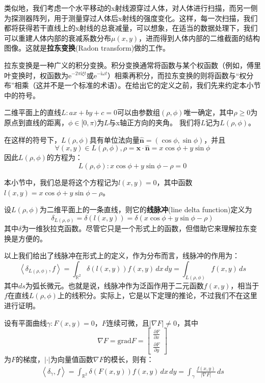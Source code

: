 类似地，我们考虑一个水平移动的x射线源穿过人体，对人体进行扫描，而另一侧为探测器阵列，用于测量穿过人体后x射线的强度变化。这样，每一次扫描，我们都将获得若干直线上的x射线的总衰减量，可以想象，在适当的数据处理下，我们可以重建人体内部的衰减系数分布$\mu(x,y)$，进而得到人体内部的二维截面的结构图像。这就是\textbf{拉东变换}(Radon transform)做的工作。

拉东变换是一种广义的积分变换。积分变换通常将函数与某个权函数（例如，傅里叶变换时，权函数为$\mathrm{e}^{-2\pi \mathrm{i}\xi t}$或$\mathrm{e}^{-\mathrm{i}\omega t}$）相乘再积分，而拉东变换的则将函数与“权分布”相乘（这并不是一个标准的术语）。在给出它的定义之前，我们先来约定本小节中的符号。

\begin{definition}[二位平面上的直线系]
    二维平面上的直线$L:ax+by+c=0$可以由参数组$(\rho,\phi)$唯一确定，其中$\rho\geq 0$为原点到直线的距离，$\phi\in[0,\pi)$为$L$与x轴正方向的夹角。
    我们将$L$记为$L(\rho,\phi)$。
\end{definition}

在这样的符号下，$L(\rho,\phi)$具有单位法向量$\hat{\mathbf{n}}=(\cos\phi,\sin\phi)$，并且$$\forall (x,y)\in L(\rho,\phi),\rho=\mathbf{x}\cdot\hat{\mathbf{n}}=x\cos\phi+y\sin\phi$$
因此$L(\rho,\phi)$的方程为：
\[L(\rho,\phi): x\cos\phi+y\sin\phi-\rho=0\]

本小节中，我们总是将这个方程记为$l(x,y)=0$，其中函数$l(x,y)=x\cos\phi+y\sin\phi-\rho$。

\begin{definition}[线脉冲]
    设$L(\rho,\phi)$为二维平面上的一条直线，则它的\textbf{线脉冲}(line delta function)定义为
    \[\delta_{L(\rho,\phi)}=\delta(l(x,y))=\delta(x\cos\phi+y\sin\phi-\rho)\]
    其中$\delta$为一维狄拉克函数。尽管它只是一个形式上的函数，但借助它来理解拉东变换是方便的。
\end{definition}

以上我们给出了线脉冲在形式上的定义，作为分布而言，线脉冲的作用为：
\[\left\langle \delta_{L(\rho,\phi)},f\right\rangle=\int_{\mathbb{R}^2}\delta(l(x,y))f(x,y)\,dx\,dy=\int_{L(\rho,\phi)}f(x,y)\,ds\]
其中$ds$为弧长微元。也就是说，线脉冲作为泛函作用于二元函数$f(x,y)$，相当于$f$在直线$L(\rho,\phi)$上的线积分。实际上，它是以下定理的推论，不过我们不在这里进行证明。
\begin{claim}
    设有平面曲线$\gamma:F(x,y)=0$，$F$连续可微，且$|\nabla F|\neq 0$，其中
    \[\nabla F=\text{grad}F=\begin{bmatrix}
        \frac{\partial F}{\partial x}\\
        \frac{\partial F}{\partial y}        
    \end{bmatrix}\]
    为$F$的梯度，$|\cdot|$为向量值函数$\nabla F$的模长，则有：
    \begin{align*}
        \left\langle \delta_{\gamma},f\right\rangle=\int_{\mathbb{R}^2}\delta(F(x,y))f(x,y)\,dx\,dy=\int_{\gamma}\frac{f(x,y)}{|\nabla F|}\,ds
    \end{align*}
\end{claim}

